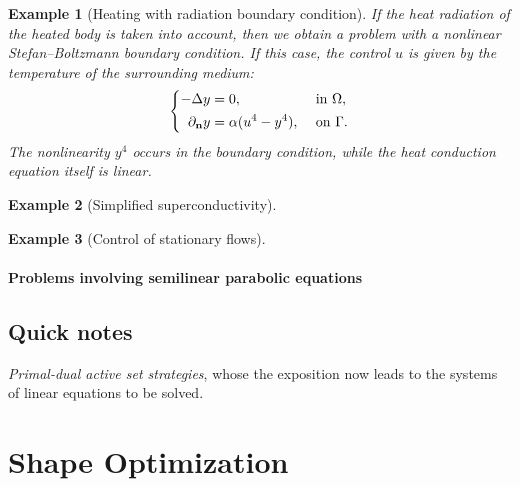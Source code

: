 \documentclass[oneside]{book}
\numberwithin{equation}{section}
\newtheorem{example}{Example}[chapter]
\begin{document}
\begin{example}[Heating with radiation boundary condition]
	If the heat radiation of the heated body is taken into account, then we obtain a problem with a nonlinear Stefan--Boltzmann boundary condition. If this case, the control $u$ is given by the temperature of the surrounding medium:
	\begin{equation*}
		\left\{\begin{split}
			-\Delta y &= 0,&&\mbox{ in }\Omega,\\
			\partial_{\bf n}y &= \alpha(u^4 - y^4),&&\mbox{ on }\Gamma.
		\end{split}\right.
	\end{equation*}
	The nonlinearity $y^4$ occurs in the boundary condition, while the heat conduction equation itself is linear.
\end{example}

\begin{example}[Simplified superconductivity]
	
\end{example}

\begin{example}[Control of stationary flows]
	
\end{example}

\subsubsection{Problems involving semilinear parabolic equations}

\section*{Quick notes}
\textit{Primal-dual active set strategies}, whose the exposition now leads to the systems of linear equations to be solved.


\chapter{Shape Optimization}
\end{document}
